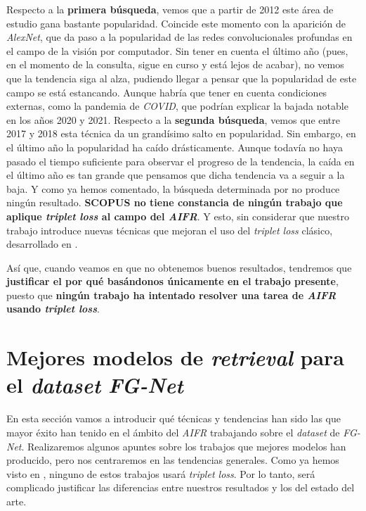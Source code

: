Respecto a la \textbf{primera búsqueda}, vemos que a partir de 2012 este área de estudio gana bastante popularidad. Coincide este momento con la aparición de \textit{AlexNet}, que da paso a la popularidad de las redes convolucionales profundas en el campo de la visión por computador. Sin tener en cuenta el último año (pues, en el momento de la consulta, sigue en curso y está lejos de acabar), no vemos que la tendencia siga al alza, pudiendo llegar a pensar que la popularidad de este campo se está estancando. Aunque habría que tener en cuenta condiciones externas, como la pandemia de \textit{COVID}, que podrían explicar la bajada notable en los años 2020 y 2021. Respecto a la \textbf{segunda búsqueda}, vemos que entre 2017 y 2018 esta técnica da un grandísimo salto en popularidad. Sin embargo, en el último año la popularidad ha caído drásticamente. Aunque todavía no haya pasado el tiempo suficiente para observar el progreso de la tendencia, la caída en el último año es tan grande que pensamos que dicha tendencia va a seguir a la baja. Y como ya hemos comentado, la búsqueda determinada por  no produce ningún resultado. \textbf{SCOPUS no tiene constancia de ningún trabajo que aplique \textit{triplet loss} al campo del \textit{AIFR}}. Y esto, sin considerar que nuestro trabajo introduce nuevas técnicas que mejoran el uso del \textit{triplet loss} clásico, desarrollado en .

Así que, cuando veamos en  que no obtenemos buenos resultados, tendremos que \textbf{justificar el por qué basándonos únicamente en el trabajo presente}, puesto que \textbf{ningún trabajo ha intentado resolver una tarea de \textit{AIFR} usando \textit{triplet loss}}.

\section{Mejores modelos de \textit{retrieval} para el \textit{dataset} \textit{FG-Net}} \label{isec:mejores_modelos_estado_arte}

En esta sección vamos a introducir qué técnicas y tendencias han sido las que mayor éxito han tenido en el ámbito del \textit{AIFR} trabajando sobre el \textit{dataset} de \textit{FG-Net}. Realizaremos algunos apuntes sobre los trabajos que mejores modelos han producido, pero nos centraremos en las tendencias generales.
Como ya hemos visto en , ninguno de estos trabajos usará \textit{triplet loss}. Por lo tanto, será complicado justificar las diferencias entre nuestros resultados y los del estado del arte.


